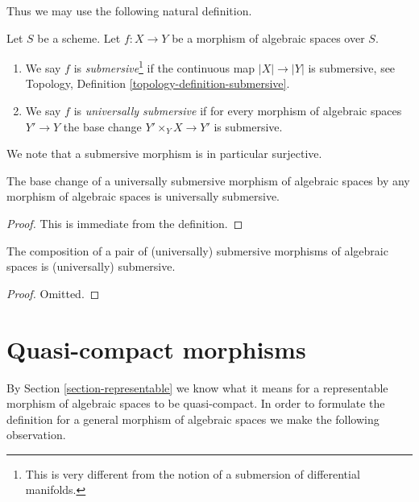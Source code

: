 \noindent
Thus we may use the following natural definition.

\begin{definition}
\label{definition-submersive}
Let $S$ be a scheme.
Let $f : X \to Y$ be a morphism of algebraic spaces over $S$.
\begin{enumerate}
\item We say $f$ is {\it submersive}\footnote{This is very different
from the notion of a submersion of differential manifolds.}
if the continuous map $|X| \to |Y|$ is submersive, see
Topology, Definition \ref{topology-definition-submersive}.
\item We say $f$ is {\it universally submersive} if for every
morphism of algebraic spaces $Y' \to Y$ the base change
$Y' \times_Y X \to Y'$ is submersive.
\end{enumerate}
\end{definition}

\noindent
We note that a submersive morphism is in particular surjective.

\begin{lemma}
\label{lemma-base-change-universally-submersive}
The base change of a universally submersive morphism of algebraic spaces
by any morphism of algebraic spaces is universally submersive.
\end{lemma}

\begin{proof}
This is immediate from the definition.
\end{proof}

\begin{lemma}
\label{lemma-composition-universally-submersive}
The composition of a pair of (universally) submersive morphisms of
algebraic spaces is (universally) submersive.
\end{lemma}

\begin{proof}
Omitted.
\end{proof}












\section{Quasi-compact morphisms}
\label{section-quasi-compact}

\noindent
By Section \ref{section-representable} we know what it means for
a representable morphism of algebraic spaces to be quasi-compact.
In order to formulate the definition for a general morphism
of algebraic spaces we make the following observation.

